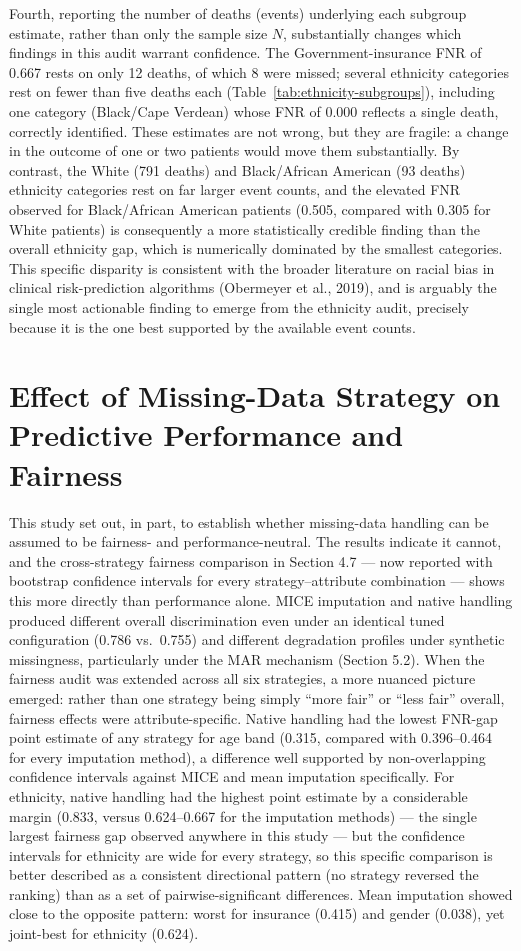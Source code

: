 \documentclass[12pt,a4paper]{report}
\begin{document}
Fourth, reporting the number of deaths (events) underlying each subgroup estimate, rather than only the sample size $N$, substantially changes which findings in this audit warrant confidence. The Government-insurance FNR of 0.667 rests on only 12 deaths, of which 8 were missed; several ethnicity categories rest on fewer than five deaths each (Table~\ref{tab:ethnicity-subgroups}), including one category (Black/Cape Verdean) whose FNR of 0.000 reflects a single death, correctly identified. These estimates are not wrong, but they are fragile: a change in the outcome of one or two patients would move them substantially. By contrast, the White (791 deaths) and Black/African American (93 deaths) ethnicity categories rest on far larger event counts, and the elevated FNR observed for Black/African American patients (0.505, compared with 0.305 for White patients) is consequently a more statistically credible finding than the overall ethnicity gap, which is numerically dominated by the smallest categories. This specific disparity is consistent with the broader literature on racial bias in clinical risk-prediction algorithms (Obermeyer et al., 2019), and is arguably the single most actionable finding to emerge from the ethnicity audit, precisely because it is the one best supported by the available event counts.


\section{Effect of Missing-Data Strategy on Predictive Performance and Fairness}
This study set out, in part, to establish whether missing-data handling can be assumed to be fairness- and performance-neutral. The results indicate it cannot, and the cross-strategy fairness comparison in Section 4.7 --- now reported with bootstrap confidence intervals for every strategy--attribute combination --- shows this more directly than performance alone. MICE imputation and native handling produced different overall discrimination even under an identical tuned configuration (0.786 vs.\ 0.755) and different degradation profiles under synthetic missingness, particularly under the MAR mechanism (Section 5.2). When the fairness audit was extended across all six strategies, a more nuanced picture emerged: rather than one strategy being simply ``more fair'' or ``less fair'' overall, fairness effects were attribute-specific. Native handling had the lowest FNR-gap point estimate of any strategy for age band (0.315, compared with 0.396--0.464 for every imputation method), a difference well supported by non-overlapping confidence intervals against MICE and mean imputation specifically. For ethnicity, native handling had the highest point estimate by a considerable margin (0.833, versus 0.624--0.667 for the imputation methods) --- the single largest fairness gap observed anywhere in this study --- but the confidence intervals for ethnicity are wide for every strategy, so this specific comparison is better described as a consistent directional pattern (no strategy reversed the ranking) than as a set of pairwise-significant differences. Mean imputation showed close to the opposite pattern: worst for insurance (0.415) and gender (0.038), yet joint-best for ethnicity (0.624).
\end{document}
